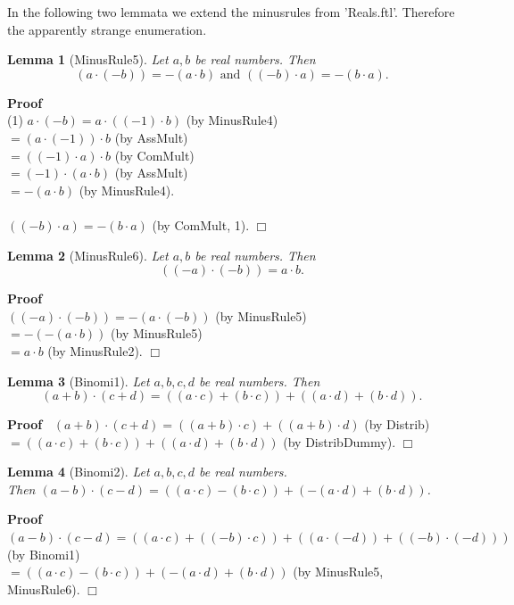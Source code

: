 \documentclass{article}
\newenvironment{forthel}{\begin{leftbar}}{\end{leftbar}}
\newenvironment{proof}{\noindent\textbf{Proof\ }}{\hspace*{\fill}$\Box$\medskip}
\newtheorem{lemma}{Lemma}
\newcommand{\dotequal}{=}
\begin{document}
\noindent In the following two lemmata we extend the minusrules from 'Reals.ftl'. Therefore the apparently strange enumeration.

\begin{forthel}
		
	\begin{lemma}[MinusRule5]
	Let $a,b$ be real numbers. 
	Then $$(a \cdot (-b)) = -(a \cdot b) \text{ and } ((-b) \cdot a) = -(b \cdot a).$$
	\end{lemma}
	\begin{proof} \\
	(1) $a \cdot (-b) \dotequal a \cdot ((-1) \cdot b)$ (by MinusRule4)
	\\$\dotequal (a \cdot (-1)) \cdot b$ (by AssMult)
	\\$\dotequal ((-1) \cdot a) \cdot b$ (by ComMult)
	\\$\dotequal (-1) \cdot (a \cdot b)$ (by AssMult)
	\\$\dotequal -(a \cdot b)$ (by MinusRule4).
	\\\\$((-b) \cdot a) \dotequal -(b \cdot a)$ (by ComMult, 1).
	\end{proof}
	
	\begin{lemma}[MinusRule6]
	Let $a,b$ be real numbers. 
	Then $$((-a) \cdot (-b)) = a \cdot b.$$
	\end{lemma}
	\begin{proof}\\
	$((-a) \cdot (-b)) \dotequal -(a \cdot (-b))$ (by MinusRule5)
	\\$\dotequal -(-(a \cdot b))$ (by MinusRule5)
	\\$\dotequal a \cdot b$ (by MinusRule2).
	\end{proof}
	
	\begin{lemma}[Binomi1]
	Let $a,b,c,d$ be real numbers.
	Then $$(a + b) \cdot (c + d) = ((a \cdot c) + (b \cdot c)) + ((a \cdot d) + (b \cdot d)).$$
	\end{lemma}
	\begin{proof}
	$(a + b) \cdot (c + d) \dotequal ((a + b) \cdot c) + ((a + b) \cdot d)$ (by Distrib)
	\\$\dotequal ((a \cdot c) + (b \cdot c)) + ((a \cdot d) + (b \cdot d))$ (by DistribDummy).
	\end{proof}
	
	\begin{lemma}[Binomi2]
	Let $a,b,c,d$ be real numbers.
	\\Then $(a - b) \cdot (c - d) = ((a \cdot c) - (b \cdot c)) + (-(a \cdot d) + (b \cdot d))$.
	\end{lemma}
	\begin{proof}
	$(a - b) \cdot (c - d) \dotequal ((a \cdot c) + ((-b) \cdot c)) + ((a \cdot (-d)) + ((-b) \cdot (-d)))$ (by Binomi1)
	\\$\dotequal ((a \cdot c) - (b \cdot c)) + (-(a \cdot d) + (b \cdot d))$ (by MinusRule5, MinusRule6).
	\end{proof}
	
\end{forthel}
\end{document}
